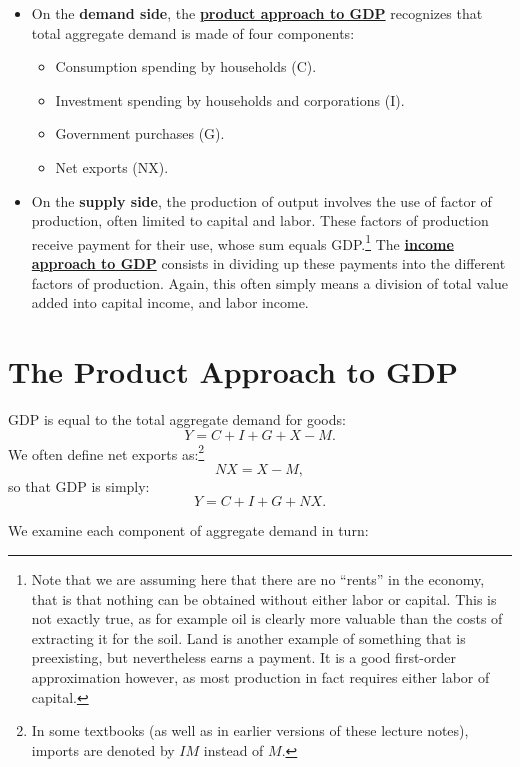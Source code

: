 \documentclass[]{book}
\providecommand{\tightlist}{%
  \setlength{\itemsep}{0pt}\setlength{\parskip}{0pt}}
\let\rmarkdownfootnote\footnote%
\def\footnote{\protect\rmarkdownfootnote}
\theoremstyle{definition}
\theoremstyle{definition}
\theoremstyle{definition}
\theoremstyle{remark}
\begin{document}
\begin{itemize}
\tightlist
\item
  On the \textbf{demand side}, the
  \protect\hyperlink{gdp-product}{\textbf{product approach to GDP}}
  recognizes that total aggregate demand is made of four components:

  \begin{itemize}
  \tightlist
  \item
    Consumption spending by households (C).
  \item
    Investment spending by households and corporations (I).
  \item
    Government purchases (G).
  \item
    Net exports (NX).
  \end{itemize}
\item
  On the \textbf{supply side}, the production of output involves the use
  of factor of production, often limited to capital and labor. These
  factors of production receive payment for their use, whose sum equals
  GDP.\footnote{Note that we are assuming here that there are no
    ``rents'' in the economy, that is that nothing can be obtained
    without either labor or capital. This is not exactly true, as for
    example oil is clearly more valuable than the costs of extracting it
    for the soil. Land is another example of something that is
    preexisting, but nevertheless earns a payment. It is a good
    first-order approximation however, as most production in fact
    requires either labor of capital.} The
  \protect\hyperlink{gdp-income}{\textbf{income approach to GDP}}
  consists in dividing up these payments into the different factors of
  production. Again, this often simply means a division of total value
  added into capital income, and labor income.
\end{itemize}

\hypertarget{gdp-product}{\section{The Product Approach to
GDP}\label{gdp-product}}

GDP is equal to the total aggregate demand for goods:
\[ Y = C + I + G + X -M.\] We often define net exports as:\footnote{In
  some textbooks (as well as in earlier versions of these lecture
  notes), imports are denoted by \(IM\) instead of \(M\).} \[NX = X-M,\]
so that GDP is simply: \[ Y = C + I + G + NX.\]

We examine each component of aggregate demand in turn:
\end{document}
